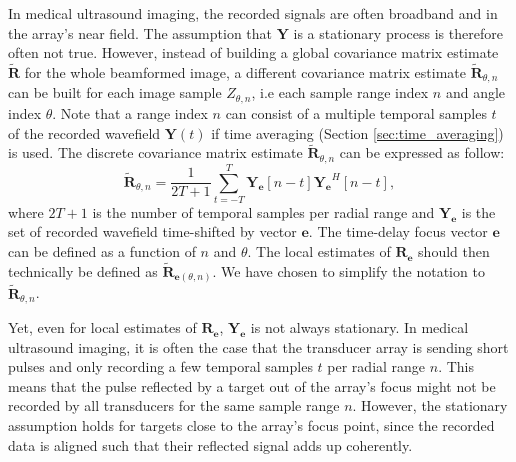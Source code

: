 In medical ultrasound imaging, the recorded signals are often broadband and in the array's near field. The assumption that $\boldsymbol{Y}$ is a stationary process is therefore often not true.
However, instead of building a global covariance matrix estimate $\boldsymbol{\tilde{R}}$ for the whole beamformed image, a different covariance matrix estimate $\boldsymbol{\tilde{R}}_{\theta,n}$ can be built for each image sample $Z_{\theta, n}$, i.e each sample range index $n$ and angle index $\theta$.
Note that a range index $n$ can consist of a multiple temporal samples $t$ of the recorded wavefield $\boldsymbol{Y}(t)$ if time averaging (Section \ref{sec:time_averaging}) is used.
The discrete covariance matrix estimate $\boldsymbol{\tilde{R}}_{\theta,n}$ can be expressed as follow:
\begin{equation}
    \tilde{\boldsymbol{R}}_{\theta,n} = \frac{1}{2T+1} \sum_{t=-T}^{T} \boldsymbol{Y_e}[n - t] \boldsymbol{Y_e}^H[n - t],
\label{eq:cov_matrix}
\end{equation}
\noindent
where $2T + 1$ is the number of temporal samples per radial range and $\boldsymbol{Y_e}$ is the set of recorded wavefield time-shifted by vector $\boldsymbol{e}$. The time-delay focus vector $\boldsymbol{e}$ can be defined as a function of $n$ and $\theta$.
The local estimates of $\boldsymbol{R_e}$ should then technically be defined as $\boldsymbol{\tilde{R}}_{\boldsymbol{e}(\theta,n)}$.
We have chosen to simplify the notation to $\tilde{\boldsymbol{R}}_{\theta,n}$.

Yet, even for local estimates of $\boldsymbol{R_e}$, $\boldsymbol{Y_e}$ is not always stationary. In medical ultrasound imaging, it is often the case that the transducer array is sending short pulses and only recording a few temporal samples $t$ per radial range $n$. This means that the pulse reflected by a target out of the array's focus might not be recorded by all transducers for the same sample range $n$. However, the stationary assumption holds for targets close to the array's focus point, since the recorded data is aligned such that their reflected signal adds up coherently.